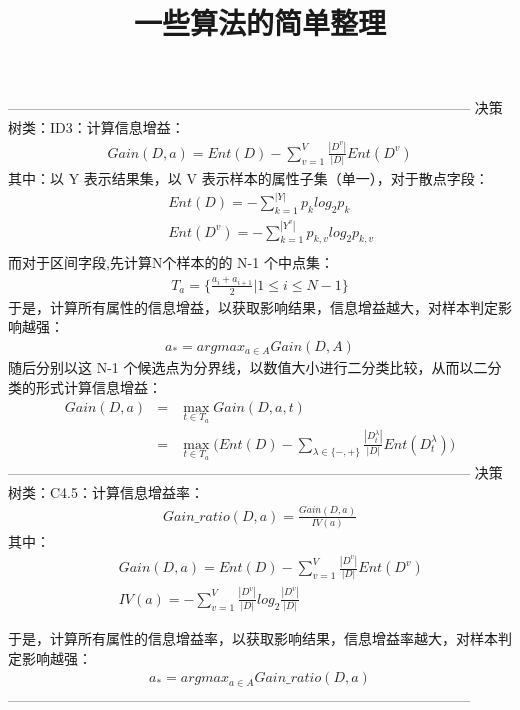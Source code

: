 \documentclass{article}
\title{一些算法的简单整理}
\begin{document}
\maketitle
\noindent ---------------------------------------------------------------------------------------------------
决策树类：ID3：计算信息增益：
\begin{eqnarray*}
Gain(D,a) = Ent(D) - \sum_{v=1}^{V}\frac{|D^{v}|}{|D|}Ent(D^{v})
\end{eqnarray*}
其中：以 Y 表示结果集，以 V 表示样本的属性子集（单一），对于散点字段：
\begin{eqnarray*}
&&Ent(D) = -\sum_{k=1}^{|Y|}p_{k}log_{2}p_{k}\\
&&Ent(D^{v}) = -\sum_{k=1}^{|Y^{v}|}p_{k,v}log_{2}p_{k,v}\\
\end{eqnarray*}
而对于区间字段,先计算N个样本的的 N-1 个中点集：
\begin{eqnarray*}
T_{a} = \{\frac{a_{i}+a_{i+1}}{2}|1\leq i\leq N-1\}
\end{eqnarray*}
于是，计算所有属性的信息增益，以获取影响结果，信息增益越大，对样本判定影响越强：
\begin{eqnarray*}
a_{*} = argmax_{a\in A}Gain(D,A)
\end{eqnarray*}
随后分别以这 N-1 个候选点为分界线，以数值大小进行二分类比较，从而以二分类的形式计算信息增益：
\begin{eqnarray*}
Gain(D,a) &=& \max_{t\in T_{a}} Gain(D,a,t)\\
&=&\max_{t\in T_{a}}\big(Ent(D) - \sum_{\lambda\in\{-,+\}}\frac{|D_{t}^{\lambda}|}{|D|}Ent(D_{t}^{\lambda})\big)
\end{eqnarray*}
---------------------------------------------------------------------------------------------------
\noindent 决策树类：C4.5：计算信息增益率：
\begin{eqnarray*}
Gain\_ratio(D, a) = \frac{Gain(D, a)}{IV(a)}
\end{eqnarray*}
其中：
\begin{eqnarray*}
&&Gain(D,a) = Ent(D) - \sum_{v=1}^{V}\frac{|D^{v}|}{|D|}Ent(D^{v})\\
&&IV(a) = - \sum_{v=1}^{V}\frac{|D^{v}|}{|D|}log_{2}\frac{|D^{v}|}{|D|}
\end{eqnarray*}

于是，计算所有属性的信息增益率，以获取影响结果，信息增益率越大，对样本判定影响越强：
\begin{eqnarray*}
a_{*} = argmax_{a\in A}Gain\_ratio(D,a)
\end{eqnarray*}
---------------------------------------------------------------------------------------------------
\end{document}
